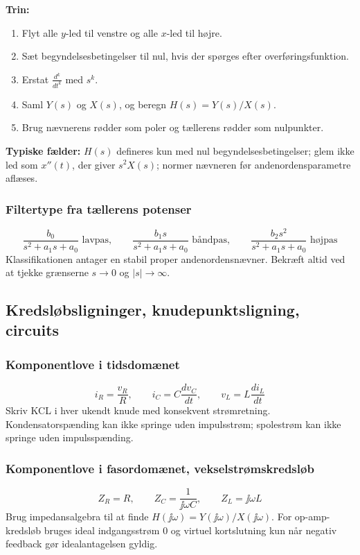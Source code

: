 \textbf{Trin:}
\begin{enumerate}
    \item Flyt alle \(y\)-led til venstre og alle \(x\)-led til højre.
    \item Sæt begyndelsesbetingelser til nul, hvis der spørges efter overføringsfunktion.
    \item Erstat \(\frac{d^k}{dt^k}\) med \(s^k\).
    \item Saml \(Y(s)\) og \(X(s)\), og beregn \(H(s)=Y(s)/X(s)\).
    \item Brug nævnerens rødder som poler og tællerens rødder som nulpunkter.
\end{enumerate}

\textbf{Typiske fælder:} \(H(s)\) defineres kun med nul begyndelsesbetingelser; glem ikke led som \(x''(t)\), der giver \(s^2X(s)\); normer nævneren før andenordensparametre aflæses.

\subsubsection{Filtertype fra tællerens potenser}
\[
\frac{b_0}{s^2+a_1s+a_0}\text{ lavpas},\qquad
\frac{b_1s}{s^2+a_1s+a_0}\text{ båndpas},\qquad
\frac{b_2s^2}{s^2+a_1s+a_0}\text{ højpas}
\]
Klassifikationen antager en stabil proper andenordensnævner. Bekræft altid ved at tjekke grænserne \(s\to0\) og \(|s|\to\infty\).

\subsection{Kredsløbsligninger, knudepunktsligning, circuits}

\subsubsection{Komponentlove i tidsdomænet}
\[
i_R=\frac{v_R}{R},\qquad i_C=C\frac{dv_C}{dt},\qquad v_L=L\frac{di_L}{dt}
\]
Skriv KCL i hver ukendt knude med konsekvent strømretning. Kondensatorspænding kan ikke springe uden impulsstrøm; spolestrøm kan ikke springe uden impulsspænding.

\subsubsection{Komponentlove i fasordomænet, vekselstrømskredsløb}
\[
Z_R=R,\qquad Z_C=\frac{1}{\jj\omega C},\qquad Z_L=\jj\omega L
\]
Brug impedansalgebra til at finde \(H(\jj\omega)=Y(\jj\omega)/X(\jj\omega)\). For op-amp-kredsløb bruges ideal indgangsstrøm \(0\) og virtuel kortslutning kun når negativ feedback gør idealantagelsen gyldig.

